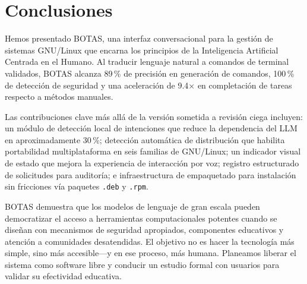 \documentclass[10pt,a4paper]{article}
\begin{document}
\section{Conclusiones}
\label{sec:conclusion}

Hemos presentado BOTAS, una interfaz conversacional para la gesti\'{o}n de sistemas GNU/Linux que encarna los principios de la Inteligencia Artificial Centrada en el Humano. Al traducir lenguaje natural a comandos de terminal validados, BOTAS alcanza 89\,\% de precisi\'{o}n en generaci\'{o}n de comandos, 100\,\% de detecci\'{o}n de seguridad y una aceleraci\'{o}n de 9.4$\times$ en completaci\'{o}n de tareas respecto a m\'{e}todos manuales.

Las contribuciones clave m\'{a}s all\'{a} de la versi\'{o}n sometida a revisi\'{o}n ciega incluyen: un m\'{o}dulo de detecci\'{o}n local de intenciones que reduce la dependencia del LLM en aproximadamente 30\,\%; detecci\'{o}n autom\'{a}tica de distribuci\'{o}n que habilita portabilidad multiplataforma en seis familias de GNU/Linux; un indicador visual de estado que mejora la experiencia de interacci\'{o}n por voz; registro estructurado de solicitudes para auditor\'{i}a; e infraestructura de empaquetado para instalaci\'{o}n sin fricciones v\'{i}a paquetes \texttt{.deb} y \texttt{.rpm}.

BOTAS demuestra que los modelos de lenguaje de gran escala pueden democratizar el acceso a herramientas computacionales potentes cuando se dise\~{n}an con mecanismos de seguridad apropiados, componentes educativos y atenci\'{o}n a comunidades desatendidas. El objetivo no es hacer la tecnolog\'{i}a m\'{a}s simple, sino m\'{a}s accesible---y en ese proceso, m\'{a}s humana. Planeamos liberar el sistema como software libre y conducir un estudio formal con usuarios para validar su efectividad educativa.


{
\fontsize{9}{10.8}\selectfont
\setlength{\bibhang}{0.5cm}
\setlength{\bibsep}{2pt}

}
\end{document}
